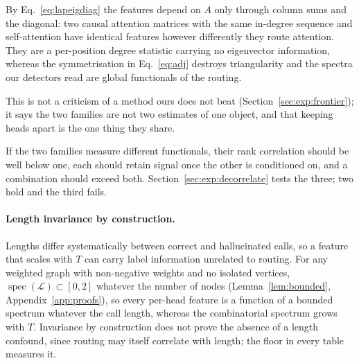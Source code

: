 \begin{remark}
\label{prop:lapeig}
By Eq.~\ref{eq:lapeigdiag} the features depend on $A$ only through column sums and the diagonal: two causal
attention matrices with the same in-degree sequence and self-attention have identical features however
differently they route attention. They are a per-position degree statistic carrying no eigenvector
information, whereas the symmetrisation in Eq.~\ref{eq:adj} destroys triangularity and the spectra our
detectors read are global functionals of the routing.
\end{remark}

This is not a criticism of a method ours does not beat (Section~\ref{sec:exp:frontier}); it says the two
families are not two estimates of one object, and that keeping heads apart is the one thing they share.

\begin{corollary}
\label{cor:decorrelate}
If the two families measure different functionals, their rank correlation should be well below one, each
should retain signal once the other is conditioned on, and a combination should exceed both.
Section~\ref{sec:exp:decorrelate} tests the three; two hold and the third fails.
\end{corollary}

\paragraph{Length invariance by construction.}
\label{sec:theory:length}
Lengths differ systematically between correct and hallucinated calls, so a feature that scales with $T$ can
carry label information unrelated to routing. For any weighted graph with non-negative weights and no isolated
vertices, $\operatorname{spec}(\mathcal{L})\subset[0,2]$ whatever the number of nodes (Lemma~\ref{lem:bounded},
Appendix~\ref{app:proofs}), so every per-head feature is a function of a bounded spectrum whatever the call
length, whereas the combinatorial spectrum grows with $T$. Invariance by construction does not prove the
absence of a length confound, since routing may itself correlate with length; the floor in every table
measures it.
